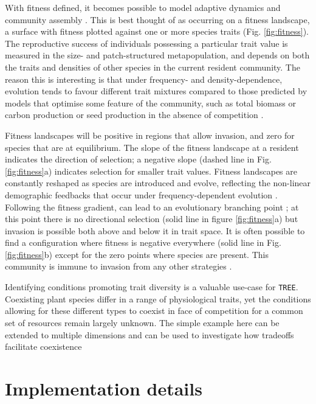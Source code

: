 \documentclass[a4paper,11pt]{article}
\begin{document}
With fitness defined, it becomes possible to model adaptive dynamics
and community assembly \citep{Dieckmann-2007, Geritz-1998}. This is best
thought of as occurring on a fitness landscape, a surface with fitness
plotted against one or more species traits (Fig. \ref{fig:fitness}). The
reproductive success of individuals possessing a particular trait value
is measured in the size- and patch-structured metapopulation, and
depends on both the traits and densities of other species in the current
resident community. The reason this is interesting is that under
frequency- and density-dependence, evolution tends to favour different
trait mixtures compared to those predicted by models that optimise some
feature of the community, such as total biomass or carbon production or
seed production in the absence of competition
\citep{Falster-2003, Dieckmann-2007}.

Fitness landscapes will be positive in regions that allow invasion, and
zero for species that are at equilibrium. The slope of the fitness
landscape at a resident indicates the direction of selection; a negative
slope (dashed line in Fig. \ref{fig:fitness}a) indicates selection for
smaller trait values. Fitness landscapes are constantly reshaped
as species are introduced and evolve, reflecting the non-linear
demographic feedbacks that occur under frequency-dependent evolution
 \citep{Geritz-1998,Dieckmann-2007}. Following the fitness gradient, can lead to an
evolutionary branching point \citep{Geritz-1998,Dieckmann-2007};
at this point there is no directional selection (solid line in
figure \ref{fig:fitness}a) but invasion is possible both above and below
it in trait space. It is often possible
to find a configuration where fitness is negative everywhere (solid line
in Fig. \ref{fig:fitness}b) except for the zero points where species are
present. This community is immune to invasion from any other strategies
\citep{Geritz-1998}.

Identifying conditions promoting trait diversity is a valuable use-case
for \texttt{TREE}. Coexisting plant species differ in a range of physiological
traits, yet the conditions allowing for these different types to coexist
in face of competition for a common set of resources remain largely
unknown. The simple example here can be extended to multiple dimensions
and can be used to investigate how tradeoffs facilitate coexistence
\citep{Falster-2015}

\section{Implementation details}
\end{document}
